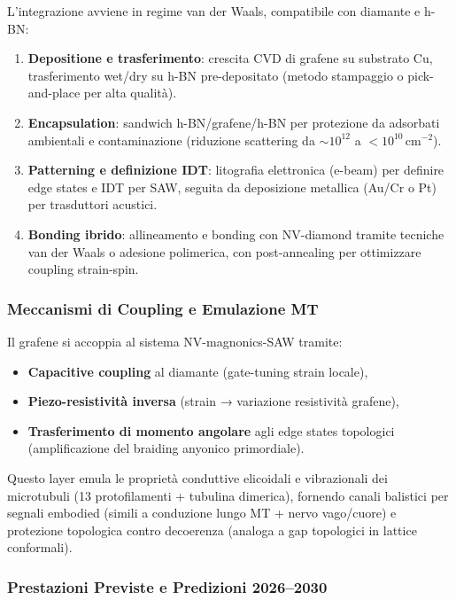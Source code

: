\documentclass[12pt,a4paper]{article}
\begin{document}
L'integrazione avviene in regime van der Waals, compatibile con diamante e h-BN:

\begin{enumerate}
    \item \textbf{Depositione e trasferimento}: crescita CVD di grafene su substrato Cu, trasferimento wet/dry su h-BN pre-depositato (metodo stampaggio o pick-and-place per alta qualità).
    \item \textbf{Encapsulation}: sandwich h-BN/grafene/h-BN per protezione da adsorbati ambientali e contaminazione (riduzione scattering da $\sim 10^{12}$ a $<10^{10}\,\mathrm{cm}^{-2}$).
    \item \textbf{Patterning e definizione IDT}: litografia elettronica (e-beam) per definire edge states e IDT per SAW, seguita da deposizione metallica (Au/Cr o Pt) per trasduttori acustici.
    \item \textbf{Bonding ibrido}: allineamento e bonding con NV-diamond tramite tecniche van der Waals o adesione polimerica, con post-annealing per ottimizzare coupling strain-spin.
\end{enumerate}

\subsubsection{Meccanismi di Coupling e Emulazione MT}

Il grafene si accoppia al sistema NV-magnonics-SAW tramite:
\begin{itemize}
    \item \textbf{Capacitive coupling} al diamante (gate-tuning strain locale),
    \item \textbf{Piezo-resistività inversa} (strain → variazione resistività grafene),
    \item \textbf{Trasferimento di momento angolare} agli edge states topologici (amplificazione del braiding anyonico primordiale).
\end{itemize}

Questo layer emula le proprietà conduttive elicoidali e vibrazionali dei microtubuli (13 protofilamenti + tubulina dimerica), fornendo canali balistici per segnali embodied (simili a conduzione lungo MT + nervo vago/cuore) e protezione topologica contro decoerenza (analoga a gap topologici in lattice conformali).

\subsubsection{Prestazioni Previste e Predizioni 2026--2030}
\end{document}
